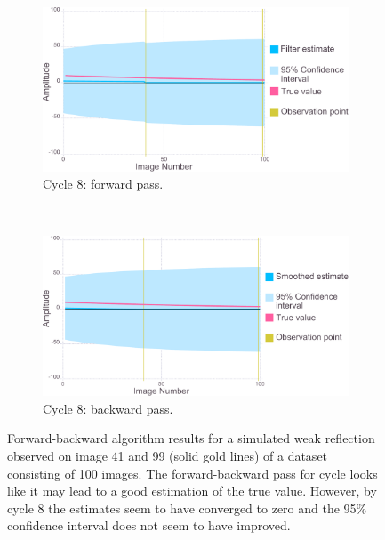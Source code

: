 \begin{figure}
    \ContinuedFloat
    \begin{subfigure}[b]{1.0\textwidth}
        \centering
        \includegraphics[width=\textwidth]{figures/datared/intDecSim_Filt8_bad.pdf}
        \caption{Cycle 8: forward pass.}
        \label{fig:UKF simulation results - cycle 8 - bad}
    \end{subfigure}
    \\
    \begin{subfigure}[b]{1.0\textwidth}
        \centering
        \includegraphics[width=\textwidth]{figures/datared/intDecSim8_bad.pdf}
        \caption{Cycle 8: backward pass.}
        \label{fig:URTSS simulation results - cycle 8 - bad}
    \end{subfigure}
    \caption{Forward-backward algorithm results for a simulated weak reflection observed on image 41 and 99 (solid gold lines) of a dataset consisting of 100 images.
    The forward-backward pass for cycle looks like it may lead to a good estimation of the true value.
    However, by cycle 8 the estimates seem to have converged to zero and the 95\% confidence interval does not seem to have improved.}
    \label{fig:forward-backward algorithm simulation results - bad}
\end{figure}

